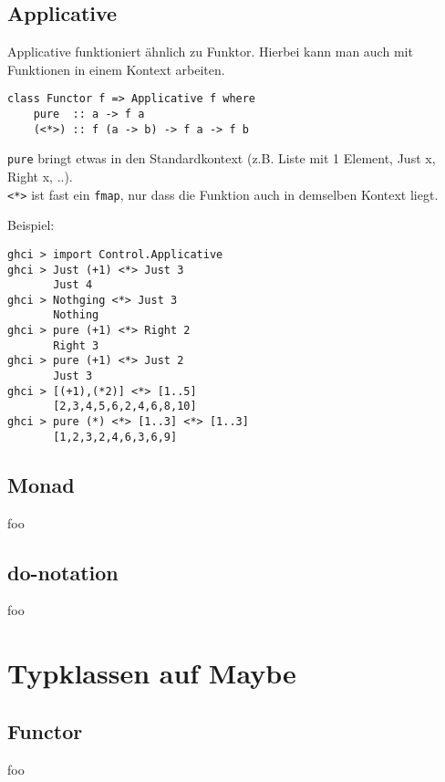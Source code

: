 \documentclass{beamer}
\begin{document}

\subsection{Applicative}
\begin{frame}[fragile]
Applicative funktioniert ähnlich zu Funktor. Hierbei kann man auch mit Funktionen in einem Kontext arbeiten.\\
\pause
\begin{verbatim}
class Functor f => Applicative f where
    pure  :: a -> f a
    (<*>) :: f (a -> b) -> f a -> f b
\end{verbatim}
\pause
\texttt{pure} bringt etwas in den Standardkontext (z.B. Liste mit 1 Element, Just x, Right x, ..).\\
\texttt{<*>} ist fast ein \texttt{fmap}, nur dass die Funktion auch in demselben Kontext liegt.
\end{frame}

\begin{frame}[fragile]
Beispiel:
\begin{verbatim}
ghci > import Control.Applicative
ghci > Just (+1) <*> Just 3
       Just 4
ghci > Nothging <*> Just 3
       Nothing
ghci > pure (+1) <*> Right 2
       Right 3
ghci > pure (+1) <*> Just 2
       Just 3
ghci > [(+1),(*2)] <*> [1..5]
       [2,3,4,5,6,2,4,6,8,10]
ghci > pure (*) <*> [1..3] <*> [1..3]
       [1,2,3,2,4,6,3,6,9]
\end{verbatim}
\end{frame}

\subsection{Monad}
\begin{frame}
 foo
\end{frame}

\subsection{do-notation}
\begin{frame}
 foo
\end{frame}

\section{Typklassen auf Maybe}
\subsection{Functor}
\begin{frame}
 foo
\end{frame}
\end{document}
